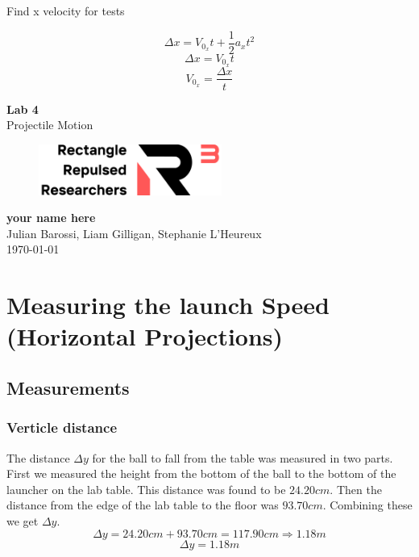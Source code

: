 \documentclass[11pt, letterpaper, includehead]{article}
\begin{document}
Find x velocity for tests

$$\Delta x = V_{0_x}t + \frac{1}{2}a_xt^2$$
$$\Delta x = V_{0_x}t$$
$$V_{0_x} = \frac{\Delta x}{t}$$

\begin{titlepage}
  \begin{center}
    \Huge{\textbf{Lab 4}}\\
    \Huge{Projectile Motion}
    \vfill
    \begin{figure}[H] %
      \centering 
      \includegraphics[width=6cm]{../logo.png}
    \end{figure}
    \large{\textbf{your name here}}\\
    \large{Julian Barossi, Liam Gilligan, Stephanie L'Heureux}\\
    \vspace{0.5cm}
    \normalsize
    \today
  \end{center}
\end{titlepage}

\tableofcontents
\pagebreak %

\pagestyle{fancy}
\fancyhead{}

\section{Measuring the launch Speed (Horizontal Projections)} %

\subsection{Measurements} %

\subsubsection{Verticle distance} %
The distance $\Delta y$ for the ball to fall from the table was measured in two parts. 
First we measured the height from the bottom of the ball to the bottom of the launcher on the lab table.
This distance was found to be $24.20cm$. Then the distance from the edge of the lab table to the 
floor was $93.70cm$. Combining these we get $\Delta y$.
$$\Delta y = 24.20cm + 93.70cm = 117.90cm \Rightarrow 1.18m$$ 
$$\boxed{\Delta y = 1.18m}$$ 
\end{document}
